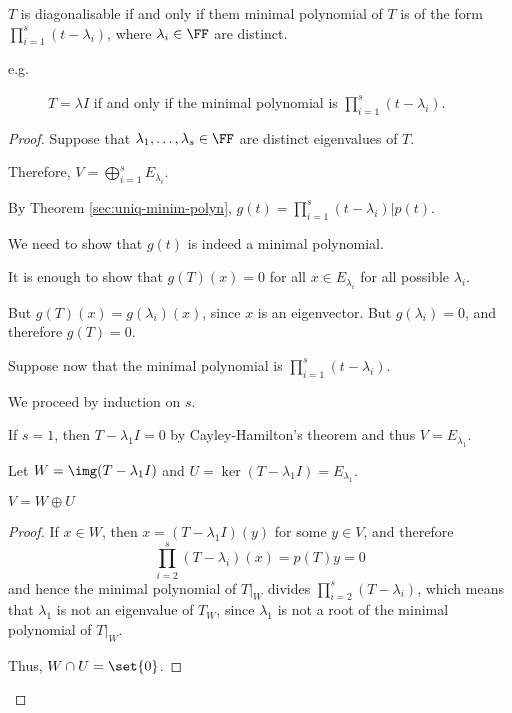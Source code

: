 \documentclass[11pt]{scrartcl}
\begin{document}
\begin{theorem}
  $T$ is diagonalisable if and only if them minimal polynomial of $T$ is of the form $\prod_{i=1}^{s} (t-\lambda_i)$, where $\lambda_i\in\FF$ are distinct.
\end{theorem}
\begin{description}

\item[e.g.] $T = \lambda I$ if and only if the minimal polynomial is $\prod_{i=1}^s(t-\lambda_{i})$.

\end{description}
\begin{proof}
  \hfill

  Suppose that $\lambda_1, \dots, \lambda_s\in\FF$ are  distinct eigenvalues of $T$.

  Therefore, $V = \bigoplus_{i=1}^{s} E_{\lambda_i}$.

  By Theorem \ref{sec:uniq-minim-polyn}, $g(t) = \prod_{i=1}^{s} (t-\lambda_i) | p(t)$.

  We need to show that $g(t)$ is indeed a minimal polynomial.

  It is enough to show that $g(T)(x) = 0$ for all $x\in E_{\lambda_i}$
  for all possible $\lambda_i$.

  But $g(T)(x) = g(\lambda_i)(x)$, since $x$ is an eigenvector. But
  $g(\lambda_i) = 0$, and therefore $g(T) = 0$.

  Suppose now that the minimal polynomial is
  $\prod_{i=1}^s(t-\lambda_{i})$.

  We proceed by induction on $s$.

  If $s=1$, then $T- \lambda_1I = 0$ by Cayley-Hamilton's theorem and
  thus $V = E_{\lambda_1}$.

  Let $W = \img (T-\lambda_1I)$ and
  $U = \ker (T-\lambda_1I) = E_{\lambda_1}$.

  \begin{claim*}
    $V = W \oplus U$
  \end{claim*}
  \begin{proof}
    \hfill

    If $x\in W$, then $x = (T-\lambda_1I)(y)$ for some $y \in V$, and
    therefore \[\prod_{i=2}^s(T-\lambda_i)(x) = p(T)y = 0\] and hence
    the minimal polynomial of $T|_W$ divides
    $\prod_{i=2}^s(T-\lambda_i)$, which means that $\lambda_1$ is not
    an eigenvalue of $T_W$, since $\lambda_1$ is not a root of the
    minimal polynomial of $T|_{W}$.

    Thus, $W\cap U = \set{0}$.


\end{proof}
\end{proof}
\end{document}
